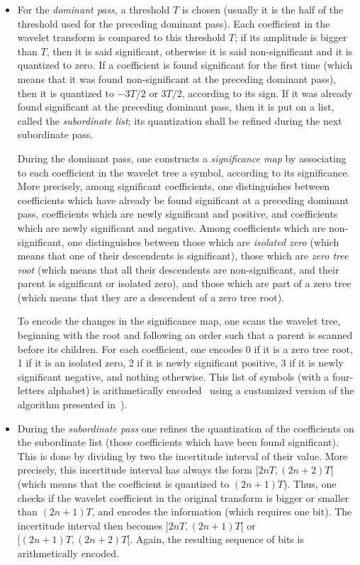 \begin{itemize} 
\item
For the {\em dominant pass,} a threshold $T$ is chosen (usually it is the half 
of the threshold used for the preceding dominant pass). Each coefficient 
in the wavelet transform is compared to this threshold $T$; if its amplitude 
is bigger than $T$, then it is said significant, otherwise it is said 
non-significant and it is quantized to zero. If a coefficient is found 
significant for the first time (which means that it was found non-significant 
at the preceding dominant pass), then it is quantized to $-3T/2$ or $3T/2$, 
according to its sign. If it was already found significant at the preceding 
dominant pass, then it is put on a list, called the {\em subordinate list}; 
its quantization 
shall be refined during the next subordinate pass. 

During the dominant pass, one constructs a {\em significance map} 
by associating to each coefficient in the wavelet tree a symbol, 
according to its significance. More precisely, among significant coefficients, 
one distinguishes between coefficients which have already be found significant 
at a preceding dominant pass, coefficients which are newly significant and 
positive, and coefficients which are newly significant and negative. 
Among coefficients which are non-significant, one distinguishes between 
those which are {\em isolated zero} (which means that one of their descendents 
is significant), those which are {\em zero tree root} (which means that 
all their descendents are non-significant, and their parent is significant 
or isolated zero), and those which are part of a zero tree (which means 
that they are a descendent of a zero tree root). 

To encode the changes in the significance map, one scans the wavelet tree, 
beginning with the root and following an order such that a parent 
is scanned before its children. 
For each coefficient, one encodes 0 if it is a zero tree root, 1 if it is 
an isolated zero, 2 if it is newly significant positive, 3 if it is newly 
significant negative, and nothing otherwise. 
This list of symbols (with a four-letters alphabet) is arithmetically 
encoded~\cite{witten.neal.ea:arithmetic} using a customized version of the algorithm 
presented in~\cite{shapiro:embedded}). 

\item
During the {\em subordinate pass} one refines the quantization 
of the coefficients on the subordinate list (those coefficients which 
have been found significant). This is done by dividing by two the incertitude 
interval of their value. More precisely, this incertitude interval has always 
the form $[2nT, (2n+2)T[$ (which means that the coefficient is quantized to 
$(2n+1)T$). Thus, one checks if the wavelet coefficient in the original 
transform is bigger or smaller than $(2n+1)T$, and encodes the information 
(which requires one bit). The incertitude interval then becomes 
$[2nT, (2n+1)T[$ or $[(2n+1)T, (2n+2)T[$. Again, the resulting sequence 
of bits is arithmetically encoded. 


\end{itemize}
